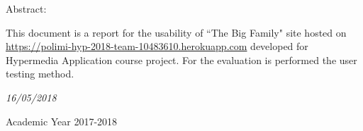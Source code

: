 \documentclass[a4paper,12pt,twoside]{report}
\begin{document}
\begin{center}
\begin{center}
\vspace{10mm}
Abstract:
\vspace{-4mm}
\end{center}
\end{center}
\large{This document is a report for the usability of ``The Big Family" site hosted on \href{https://polimi-hyp-2018-team-10483610.herokuapp.com}{https://polimi-hyp-2018-team-10483610.herokuapp.com} developed for Hypermedia Application course project. For the evaluation is performed the user testing method.}
\vspace{10mm}


\begin{center}
\vspace{-4mm}
\it{\large{16/05/2018}}
\end{center}
\begin{center}
\vspace{-4mm}
{\large{Academic Year 2017-2018}}
\end{center}

\end{document}

